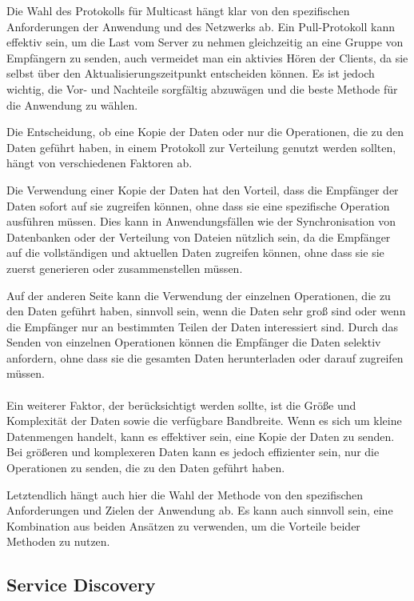 \documentclass[../vs-script-first-v01.tex]{subfiles}
\begin{document}
Die Wahl des Protokolls für Multicast hängt klar von den spezifischen Anforderungen der Anwendung und des Netzwerks ab. Ein Pull-Protokoll kann effektiv sein, um die Last vom Server zu nehmen gleichzeitig an eine Gruppe von Empfängern zu senden, auch vermeidet man ein aktivies Hören der Clients, da sie selbst über den Aktualisierungszeitpunkt entscheiden können. Es ist jedoch wichtig, die Vor- und Nachteile sorgfältig abzuwägen und die beste Methode für die Anwendung zu wählen.

Die Entscheidung, ob eine Kopie der Daten oder nur die Operationen, die zu den Daten geführt haben, in einem Protokoll zur Verteilung genutzt werden sollten, hängt von verschiedenen Faktoren ab.

Die Verwendung einer Kopie der Daten hat den Vorteil, dass die Empfänger der Daten sofort auf sie zugreifen können, ohne dass sie eine spezifische Operation ausführen müssen. Dies kann in Anwendungsfällen wie der Synchronisation von Datenbanken oder der Verteilung von Dateien nützlich sein, da die Empfänger auf die vollständigen und aktuellen Daten zugreifen können, ohne dass sie sie zuerst generieren oder zusammenstellen müssen.

Auf der anderen Seite kann die Verwendung der einzelnen Operationen, die zu den Daten geführt haben, sinnvoll sein, wenn die Daten sehr groß sind oder wenn die Empfänger nur an bestimmten Teilen der Daten interessiert sind. Durch das Senden von einzelnen Operationen können die Empfänger die Daten selektiv anfordern, ohne dass sie die gesamten Daten herunterladen oder darauf zugreifen müssen.
\\\\
Ein weiterer Faktor, der berücksichtigt werden sollte, ist die Größe und Komplexität der Daten sowie die verfügbare Bandbreite. Wenn es sich um kleine Datenmengen handelt, kann es effektiver sein, eine Kopie der Daten zu senden. Bei größeren und komplexeren Daten kann es jedoch effizienter sein, nur die Operationen zu senden, die zu den Daten geführt haben.

Letztendlich hängt auch hier die Wahl der Methode von den spezifischen Anforderungen und Zielen der Anwendung ab. Es kann auch sinnvoll sein, eine Kombination aus beiden Ansätzen zu verwenden, um die Vorteile beider Methoden zu nutzen.


\subsection{Service Discovery}
\end{document}
